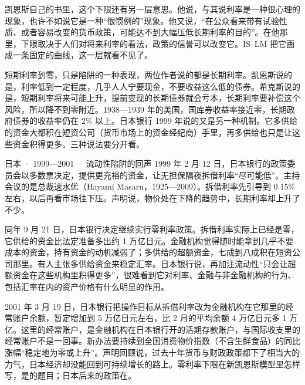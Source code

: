 凯恩斯自己的书里，这个下限还有另一层意思。他说，与其说利率是一种很心理的现象，也许不如说它是一种“很惯例的”现象\cite{keynes1936}。他又说，“在公众看来带有试验性质、或者容易改变的货币政策，可能达不到大幅压低长期利率的目的”\cite{keynes1936}。在他那里，下限取决于人们对将来利率的看法，政策的信誉可以改变它。IS–LM 把它画成一条固定的曲线，这一层就看不见了。

\begin{pitfall}[流动性陷阱就是短期利率降到零]
短期利率到零，只是陷阱的一种表现，两位作者说的都是长期利率。凯恩斯说的是，利率低到一定程度，几乎人人宁要现金，不要收益这么低的债券\cite{keynes1936}。希克斯说的是，短期利率将来可能上升，提前变现的长期债券就会亏本，长期利率要补偿这个风险，所以降不到零附近\cite{hicks1937}。1938—1939 年的美国，国库券收益率接近零，长期政府债券的收益率仍在 2\% 以上\cite{bms1943b}。日本银行 1999 年说的又是另一种机制。它多供给的资金大都积在短资公司（货币市场上的资金经纪商）手里，再多供给也只是让这些资金积得更多\cite{boj1999b}。三种说法要分开看。
\end{pitfall}

\begin{case}{日本 · 1999—2001 · 流动性陷阱的回声}
1999 年 2 月 12 日，日本银行的政策委员会以多数票决定，提供更充裕的资金，让无担保隔夜拆借利率“尽可能低”\cite{boj1999a}。主持会议的是总裁速水优（Hayami Masaru，1925—2009）\cite{boj1999a,loc33}。拆借利率先引导到 0.15\% 左右，以后再看市场往下压\cite{boj1999a}。声明说，物价处在下降的趋势中，长期利率却上升了不少\cite{boj1999a}。

同年 9 月 21 日，日本银行决定继续实行零利率政策。拆借利率实际上已经是零，它供给的资金比法定准备多出约 1 万亿日元\cite{boj1999b}。金融机构觉得随时能拿到几乎不要成本的资金，持有资金的动机减弱了；多供给的超额资金，七成到八成积在短资公司那里\cite{boj1999b}。有人主张多供给资金来稳定汇率。日本银行说，再加注流动性“只会让超额资金在这些机构里积得更多”，很难看到它对利率、金融与非金融机构的行为、包括汇率在内的资产价格有什么明显的作用\cite{boj1999b}。

2001 年 3 月 19 日，日本银行把操作目标从拆借利率改为金融机构在它那里的经常账户余额，暂定增加到 5 万亿日元左右，比 2 月的平均余额 4 万亿日元多 1 万亿\cite{boj2001}。这里的经常账户，是金融机构在日本银行开的活期存款账户，与国际收支里的经常账户不是一回事。新办法要持续到全国消费物价指数（不含生鲜食品）的同比涨幅“稳定地为零或上升”\cite{boj2001}。声明回顾说，过去十年货币与财政政策都下了相当大的力气，日本经济却没能回到可持续增长的路上\cite{boj2001}。零利率下限在新凯恩斯模型里怎样写，是的题目；日本后来的政策在。
\end{case}

